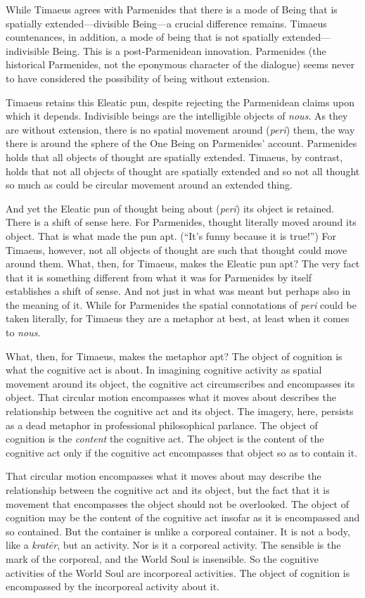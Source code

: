 While Timaeus agrees with Parmenides that there is a mode of Being that is spatially extended---divisible Being---a crucial difference remains. Timaeus countenances, in addition, a mode of being that is not spatially extended---indivisible Being. This is a post-Parmenidean innovation. Parmenides (the historical Parmenides, not the eponymous character of the dialogue) seems never to have considered the possibility of being without extension.

Timaeus retains this Eleatic pun, despite rejecting the Parmenidean claims upon which it depends. Indivisible beings are the intelligible objects of \emph{nous}. As they are without extension, there is no spatial movement around (\emph{peri}) them, the way there is around the sphere of the One Being on Parmenides' account. Parmenides holds that all objects of thought are spatially extended. Timaeus, by contrast, holds that not all objects of thought are spatially extended and so not all thought so much as could be circular movement around an extended thing.

And yet the Eleatic pun of thought being about (\emph{peri}) its object is retained. There is a shift of sense here. For Parmenides, thought literally moved around its object. That is what made the pun apt. (``It's funny because it is true!'') For Timaeus, however, not all objects of thought are such that thought could move around them. What, then, for Timaeus, makes the Eleatic pun apt? The very fact that it is something different from what it was for Parmenides by itself establishes a shift of sense. And not just in what was meant but perhaps also in the meaning of it. While for Parmenides the spatial connotations of \emph{peri} could be taken literally, for Timaeus they are a metaphor at best, at least when it comes to \emph{nous}.

What, then, for Timaeus, makes the metaphor apt? The object of cognition is what the cognitive act is about. In imagining cognitive activity as spatial movement around its object, the cognitive act circumscribes and encompasses its object. That circular motion encompasses what it moves about describes the relationship between the cognitive act and its object. The imagery, here, persists as a dead metaphor in professional philosophical parlance. The object of cognition is the \emph{content} the cognitive act. The object is the content of the cognitive act only if the cognitive act encompasses that object so as to contain it. 

That circular motion encompasses what it moves about may describe the relationship between the cognitive act and its object, but the fact that it is movement that encompasses the object should not be overlooked. The object of cognition may be the content of the cognitive act insofar as it is encompassed and so contained. But the container is unlike a corporeal container. It is not a body, like a \emph{kratēr}, but an activity. Nor is it a corporeal activity. The sensible is the mark of the corporeal, and the World Soul is insensible. So the cognitive activities of the World Soul are incorporeal activities. The object of cognition is encompassed by the incorporeal activity about it.

